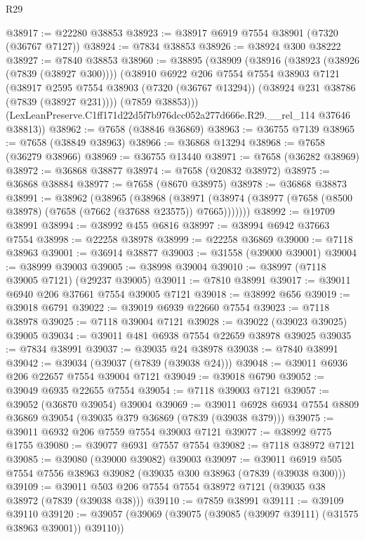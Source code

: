 \begin{lexlean}{R29}
\begin{coremodule}
@38917 := @22280 @38853
@38923 := @38917 @6919 @7554 @38901 (@7320 (@36767 @7127))
@38924 := @7834 @38853
@38926 := @38924 @300 @38222
@38927 := @7840 @38853
@38960 := @38895
    (@38909
      (@38916
        (@38923 (@38926 (@7839 (@38927 @300))))
        (@38910
          @6922
          @206
          @7554
          @7554
          @38903
          @7121
          (@38917
            @2595
            @7554
            @38903
            (@7320 (@36767 @13294))
            (@38924 @231 @38786 (@7839 (@38927 @231))))
          (@7859 @38853)))
      (LexLeanPreserve.C1ff171d22d5f7b976dcc052a277d666e.R29.__rel_114 @37646 @38813))
@38962 := @7658 (@38846 @36869)
@38963 := @36755 @7139
@38965 := @7658 (@38849 @38963)
@38966 := @36868 @13294
@38968 := @7658 (@36279 @38966)
@38969 := @36755 @13440
@38971 := @7658 (@36282 @38969)
@38972 := @36868 @38877
@38974 := @7658 (@20832 @38972)
@38975 := @36868 @38884
@38977 := @7658 (@8670 @38975)
@38978 := @36868 @38873
@38991 := @38962
    (@38965
      (@38968
        (@38971 (@38974 (@38977 (@7658 (@8500 @38978) (@7658 (@7662 (@37688 @23575)) @7665)))))))
@38992 := @19709 @38991
@38994 := @38992 @455 @6816
@38997 := @38994 @6942 @37663 @7554
@38998 := @22258 @38978
@38999 := @22258 @36869
@39000 := @7118 @38963
@39001 := @36914 @38877
@39003 := @31558 (@39000 @39001)
@39004 := @38999 @39003
@39005 := @38998 @39004
@39010 := @38997 (@7118 @39005 @7121) (@29237 @39005)
@39011 := @7810 @38991
@39017 := @39011 @6940 @206 @37661 @7554 @39005 @7121
@39018 := @38992 @656
@39019 := @39018 @6791
@39022 := @39019 @6939 @22660 @7554
@39023 := @7118 @38978
@39025 := @7118 @39004 @7121
@39028 := @39022 (@39023 @39025) @39005
@39034 := @39011 @481 @6938 @7554 @22659 @38978 @39025
@39035 := @7834 @38991
@39037 := @39035 @24 @38978
@39038 := @7840 @38991
@39042 := @39034 (@39037 (@7839 (@39038 @24)))
@39048 := @39011 @6936 @206 @22657 @7554 @39004 @7121
@39049 := @39018 @6790
@39052 := @39049 @6935 @22655 @7554
@39054 := @7118 @39003 @7121
@39057 := @39052 (@36870 @39054) @39004
@39069 := @39011 @6928 @6934 @7554 @8809 @36869 @39054 (@39035 @379 @36869 (@7839 (@39038 @379)))
@39075 := @39011 @6932 @206 @7559 @7554 @39003 @7121
@39077 := @38992 @775 @1755
@39080 := @39077 @6931 @7557 @7554
@39082 := @7118 @38972 @7121
@39085 := @39080 (@39000 @39082) @39003
@39097 := @39011 @6919 @505 @7554 @7556 @38963 @39082 (@39035 @300 @38963 (@7839 (@39038 @300)))
@39109 := @39011 @503 @206 @7554 @7554 @38972 @7121 (@39035 @38 @38972 (@7839 (@39038 @38)))
@39110 := @7859 @38991
@39111 := @39109 @39110
@39120 := @39057 (@39069 (@39075 (@39085 (@39097 @39111) (@31575 @38963 @39001)) @39110))

\end{coremodule}
\end{lexlean}
